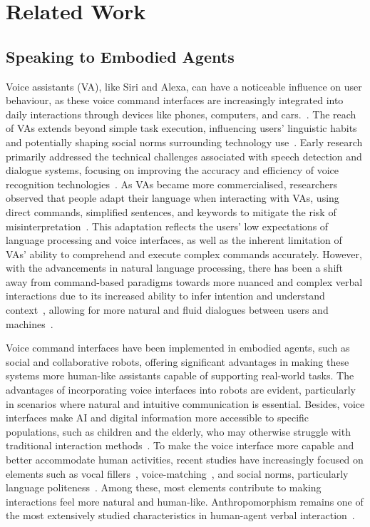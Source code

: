 \section{Related Work}
\subsection{Speaking to Embodied Agents}
Voice assistants (VA), like Siri and Alexa, can have a noticeable influence on user behaviour, as these voice command interfaces are increasingly integrated into daily interactions through devices like phones, computers, and cars.~\cite{amershi2019guidelines, tsoli2018interactive}. The reach of VAs extends beyond simple task execution, influencing users' linguistic habits and potentially shaping social norms surrounding technology use~\cite{motta2021users, williams2020excuse}. Early research primarily addressed the technical challenges associated with speech detection and dialogue systems, focusing on improving the accuracy and efficiency of voice recognition technologies~\cite{cohen1995role}. As VAs became more commercialised, researchers observed that people adapt their language when interacting with VAs, using direct commands, simplified sentences, and keywords to mitigate the risk of misinterpretation~\cite{jaber2024cooking, myers2018patterns}. This adaptation reflects the users' low expectations of language processing and voice interfaces, as well as the inherent limitation of VAs' ability to comprehend and execute complex commands accurately. However, with the advancements in natural language processing, there has been a shift away from command-based paradigms towards more nuanced and complex verbal interactions due to its increased ability to infer intention and understand context~\cite{tanneberg2024help, ning2024user}, allowing for more natural and fluid dialogues between users and machines~\cite{abdul2015survey, yi2024survey}. 

Voice command interfaces have been implemented in embodied agents, such as social and collaborative robots, offering significant advantages in making these systems more human-like assistants capable of supporting real-world tasks. The advantages of incorporating voice interfaces into robots are evident, particularly in scenarios where natural and intuitive communication is essential. Besides, voice interfaces make AI and digital information more accessible to specific populations, such as children and the elderly, who may otherwise struggle with traditional interaction methods~\cite{shiomi2015effectiveness, ruggiero2022companion}. To make the voice interface more capable and better accommodate human activities, recent studies have increasingly focused on elements such as vocal fillers~\cite{ohshima2015conversational}, voice-matching~\cite{de2024your}, and social norms, particularly language politeness~\cite{williams2020excuse}. Among these, most elements contribute to making interactions feel more natural and human-like. Anthropomorphism remains one of the most extensively studied characteristics in human-agent verbal interaction~\cite{seaborn2021voice}. 

